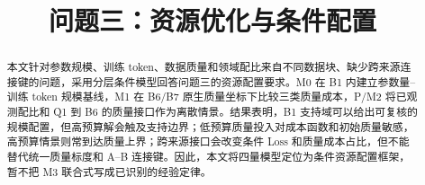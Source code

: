 \documentclass[bwprint]{template/gmcmthesis}
\title{问题三：资源优化与条件配置}
\begin{document}
\maketitle

\begin{abstract}
本文针对参数规模、训练 token、数据质量和领域配比来自不同数据块、缺少跨来源连接键的问题，采用分层条件模型回答问题三的资源配置要求。M0 在 B1 内建立参数量--训练 token 规模基线，M1 在 B6/B7 原生质量坐标下比较三类质量成本，P/M2 将已观测配比和 Q1 到 B6 的质量接口作为离散情景。结果表明，B1 支持域可以给出可复核的规模配置，但高预算解会触及支持边界；低预算质量投入对成本函数和初始质量敏感，高预算情景则常到达质量上界；跨来源接口会改变条件 Loss 和质量成本占比，但不能替代统一质量标度和 A--B 连接键。因此，本文将四量模型定位为条件资源配置框架，暂不把 M3 联合式写成已识别的经验定律。
\end{abstract}

\pagestyle{plain}

\end{document}

